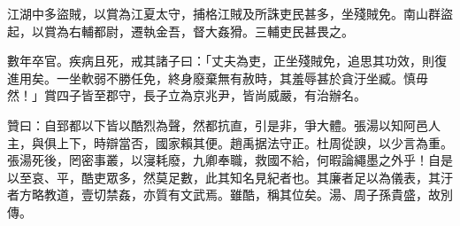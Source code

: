 \begin{pinyinscope}
江湖中多盜賊，以賞為江夏太守，捕格江賊及所誅吏民甚多，坐殘賊免。南山群盜起，以賞為右輔都尉，遷執金吾，督大姦猾。三輔吏民甚畏之。

數年卒官。疾病且死，戒其諸子曰：「丈夫為吏，正坐殘賊免，追思其功效，則復進用矣。一坐軟弱不勝任免，終身廢棄無有赦時，其羞辱甚於貪汙坐臧。慎毋然！」賞四子皆至郡守，長子立為京兆尹，皆尚威嚴，有治辦名。

贊曰：自郅都以下皆以酷烈為聲，然都抗直，引是非，爭大體。張湯以知阿邑人主，與俱上下，時辯當否，國家賴其便。趙禹据法守正。杜周從諛，以少言為重。張湯死後，罔密事叢，以寖耗廢，九卿奉職，救國不給，何暇論繩墨之外乎！自是以至哀、平，酷吏眾多，然莫足數，此其知名見紀者也。其廉者足以為儀表，其汙者方略教道，壹切禁姦，亦質有文武焉。雖酷，稱其位矣。湯、周子孫貴盛，故別傳。


\end{pinyinscope}